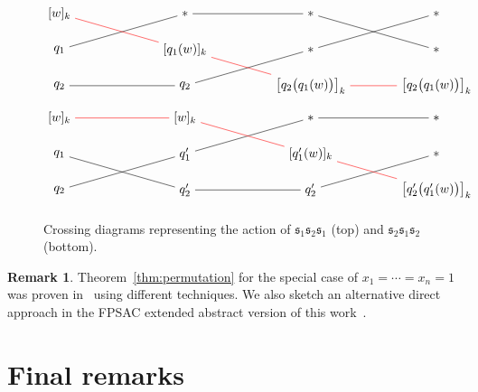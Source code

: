 \documentclass[reqno]{amsart}
\newcommand{\0}{\phantom{c}}
\newcommand{\fraks}{\mathfrak{s}}
\theoremstyle{plain}
\theoremstyle{definition}
\newtheorem{remark}[thm]{Remark}
\numberwithin{equation}{section}
\begin{document}
\begin{figure}
\begin{gather*}
\begin{tikzpicture}[xscale=3.5]
\node (i1) at (0,0) {$[w]_k$};
\node (i2) at (0,-1) {$q_1$};
\node (i3) at (0,-2) {$q_2$};
\node (s11) at (1,0) {$\ast$};
\node (s12) at (1,-1) {$[q_1(w)]_k$};
\node (s13) at (1,-2) {$q_2$};
\node (s21) at (2,0) {$\ast$};
\node (s22) at (2,-1) {$\ast$};
\node (s23) at (2,-2) {$\bigl[ q_2\bigl( q_1(w) \bigr) \bigr]_k$};
\node (t1) at (3,0) {$\ast$};
\node (t2) at (3,-1) {$\ast$};
\node (t3) at (3,-2) {$\bigl[ q_2\bigl( q_1(w) \bigr) \bigr]_k$};
\path[-] (i2) edge (s11) (s11) edge (s21) (s21) edge (t2);
\path[-] (i3) edge (s13) (s13) edge (s22) (s22) edge (t1);
\path[-,red] (i1) edge (s12) (s12) edge (s23) (s23) edge (t3);
\end{tikzpicture}
\\
\begin{tikzpicture}[xscale=3.5]
\node (i1) at (0,0) {$[w]_k$};
\node (i2) at (0,-1) {$q_1$};
\node (i3) at (0,-2) {$q_2$};
\node (s11) at (1,0) {$[w]_k$};
\node (s12) at (1,-1) {$q'_1$};
\node (s13) at (1,-2) {$q'_2$};
\node (s21) at (2,0) {$\ast$};
\node (s22) at (2,-1) {$[q'_1(w)]_k$};
\node (s23) at (2,-2) {$q'_2$};
\node (t1) at (3,0) {$\ast$};
\node (t2) at (3,-1) {$\ast$};
\node (t3) at (3,-2) {$\bigl[ q'_2\bigl( q'_1(w) \bigr) \bigr]_k$};
\path[-] (i2) edge (s13) (s13) edge (s23) (s23) edge (t2);
\path[-] (i3) edge (s12) (s12) edge (s21) (s21) edge (t1);
\path[-,red] (i1) edge (s11) (s11) edge (s22) (s22) edge (t3);
\end{tikzpicture}
\end{gather*}
\caption{Crossing diagrams representing the action of $\fraks_1 \fraks_2 \fraks_1$ (top) and $\fraks_2 \fraks_1 \fraks_2$ (bottom).}
\label{fig:crossing_diagrams}
\end{figure}

\begin{remark}
Theorem~\ref{thm:permutation} for the special case of $x_1 = \cdots = x_n = 1$ was proven in~\cite{AAMP} using different techniques.
We also sketch an alternative direct approach in the FPSAC extended abstract version of this work~\cite{AGS18}.
\end{remark}






\section{Final remarks}
\label{sec:remarks}
\end{document}
